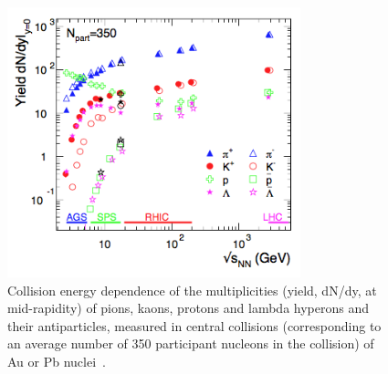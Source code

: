 \begin{figure}[!t]
  \centering
  \includegraphics[width=8.5cm]{FigCap1/YieldsVsEnergyAndronic.png}
  \caption{Collision energy dependence of the multiplicities (yield, dN/dy, at mid-rapidity) of pions, kaons, protons and lambda hyperons and their antiparticles, measured in central collisions (corresponding to an average number of 350 participant nucleons in the collision) of Au or Pb nuclei~\cite{Andronic:2014zha}.}
  \label{fig:YieldsVsEnergyAndronic}
\end{figure}


